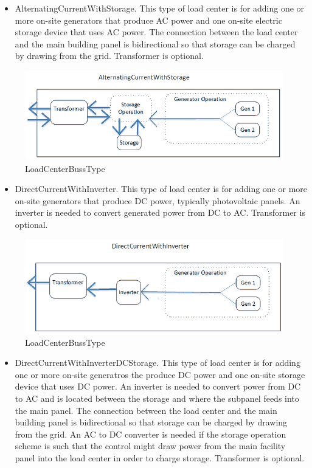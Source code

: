 \begin{itemize}
\tightlist
\item
  AlternatingCurrentWithStorage. This type of load center is for adding one or more on-site generators that produce AC power and one on-site electric storage device that uses AC power. The connection between the load center and the main building panel is bidirectional so that storage can be charged by drawing from the grid. Transformer is optional.
\end{itemize}

\begin{figure}[htbp]
\centering
\includegraphics{media/ACStorageBussDiagram.png}
\caption{LoadCenterBussType}
\end{figure}

\begin{itemize}
\tightlist
\item
  DirectCurrentWithInverter. This type of load center is for adding one or more on-site generators that produce DC power, typically photovoltaic panels. An inverter is needed to convert generated power from DC to AC. Transformer is optional.
\end{itemize}

\begin{figure}[htbp]
\centering
\includegraphics{media/DCInverterBussDiagram.png}
\caption{LoadCenterBussType}
\end{figure}

\begin{itemize}
\tightlist
\item
  DirectCurrentWithInverterDCStorage. This type of load center is for adding one or more on-site generatros the produce DC power and one on-site storage device that uses DC power. An inverter is needed to convert power from DC to AC and is located between the storage and where the subpanel feeds into the main panel. The connection between the load center and the main building panel is bidirectional so that storage can be charged by drawing from the grid. An AC to DC converter is needed if the storage operation scheme is such that the control might draw power from the main facility panel into the load center in order to charge storage. Transformer is optional.
\end{itemize}

